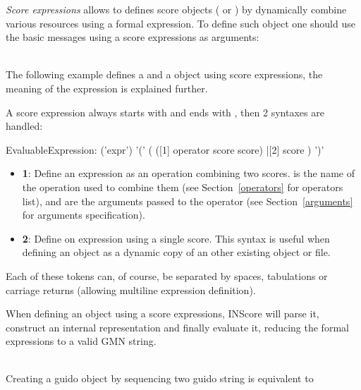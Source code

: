 \label{scoreExpr}

\emph{Score expressions} allows to defines score objects ( or ) by dynamically combine various resources using a formal expression. To define such object one should use the basic  messages using a score expressions as arguments:

\example\\
The following example defines a  and a  object using score expressions, the meaning of the expression is explained further.


A score expression  always starts with  and ends with \OSC{)}, then 
2 syntaxes are handled:

\begin{rail}
EvaluableExpression: 	('expr')
						'('
						 (
						  ([1] operator score score)
						  |[2] score
						 )
						')'
\end{rail}

\begin{itemize}
\item \textbf{1}: Define an expression as an operation combining two scores.  is the name of the operation used to combine them (see Section~\ref{operators} for operators list), and  are the arguments passed to  the operator (see Section~\ref{arguments} for arguments specification).
\item \textbf{2}: Define on expression using a single score. This syntax is useful when defining an object as a dynamic copy of an other existing object or file.
\end{itemize}
Each of these tokens can, of course, be separated by spaces, tabulations or carriage returns (allowing multiline expression definition).

When defining an object using a score expressions, INScore will parse it, construct an internal representation and finally evaluate it, reducing the formal expressions to a valid GMN string.

\example \\
Creating a guido object by sequencing two guido string
is equivalent to


